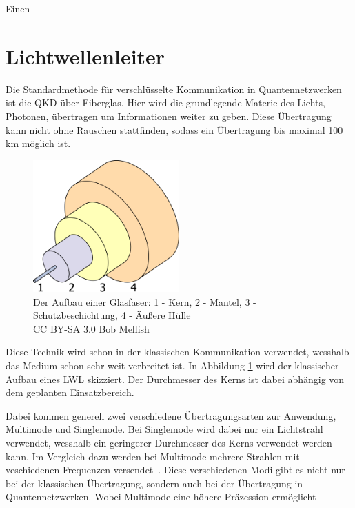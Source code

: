 Einen

\section{Lichtwellenleiter}

Die Standardmethode für verschlüsselte Kommunikation in Quantennetzwerken ist die \ac{QKD} über Fiberglas.
Hier wird die grundlegende Materie des Lichts, Photonen, übertragen um Informationen weiter zu geben.
Diese Übertragung kann nicht ohne Rauschen stattfinden, sodass ein Übertragung bis maximal 100 km möglich ist\cite{Shen2018}.

\begin{figure}[htbp] 
  \centering
     \includegraphics[width=0.5\textwidth]{img/lwl.png}
     \caption{Der Aufbau einer Glasfaser: 1 - Kern, 2 - Mantel, 3 - Schutzbeschichtung, 4 - Äußere Hülle\\
            CC BY-SA 3.0 Bob Mellish}
            \label{fig:lwlAufbau}
\end{figure}

Diese Technik wird schon in der klassischen Kommunikation verwendet, wesshalb das Medium schon sehr weit verbreitet ist.
In Abbildung \ref{fig:lwlAufbau} wird der klassischer Aufbau eines \ac{LWL} skizziert.
Der Durchmesser des Kerns ist dabei abhängig von dem geplanten Einsatzbereich.

Dabei kommen generell zwei verschiedene Übertragungsarten zur Anwendung, Multimode und Singlemode.
Bei Singlemode wird dabei nur ein Lichtstrahl verwendet, wesshalb ein geringerer Durchmesser des Kerns verwendet werden kann.
Im Vergleich dazu werden bei Multimode mehrere Strahlen mit veschiedenen Frequenzen versendet~\cite{Lichtwellenleiter}.
Diese verschiedenen Modi gibt es nicht nur bei der klassischen Übertragung, sondern auch bei der Übertragung in Quantennetzwerken.
Wobei Multimode eine höhere Präzession ermöglicht\cite{VanMeter2014}

